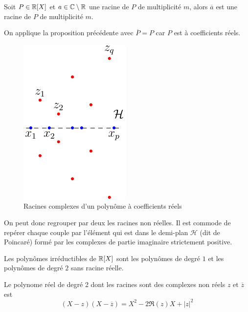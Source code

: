 \begin{prop}
 Soit $P\in \mathbb{R}[X]$ et $a\in \mathbb{C}\setminus \mathbb{R}$ une racine de $P$ de multiplicité $m$, alors $\overline{a}$ est une racine de $P$ de multiplicité $m$.
\end{prop}
\begin{demo}
 On applique la proposition précédente avec $\overline{P}=P$ car $P$ est à coefficients réels.
\end{demo}

\begin{figure}[ht]{}
 \centering
 \includegraphics{C1622_1.pdf}
 \caption{Racines complexes d'un polynôme à coefficients réels}
 \label{fig:C1622_1}
\end{figure}

\begin{rem}
 On peut donc regrouper par deux les racines non réelles. Il est commode de repérer chaque couple par l'élément qui est dans le demi-plan $\mathcal H$ (dit de Poincaré)  formé par les complexes de partie imaginaire strictement positive.
\end{rem}

\begin{prop}
Les polynômes irréductibles de $\mathbb{R}[X]$ sont les polynômes de degré $1$ et les polynômes de degré $2$ sans racine réelle.
\end{prop}
\begin{rem}
 Le polynome réel de degré 2 dont les racines sont des complexes non réels $z$ et $\overline{z}$ est
\begin{displaymath}
 (X-z)(X-\overline{z})=X^2 - 2\Re(z)X+|z|^2
\end{displaymath}
\end{rem}


